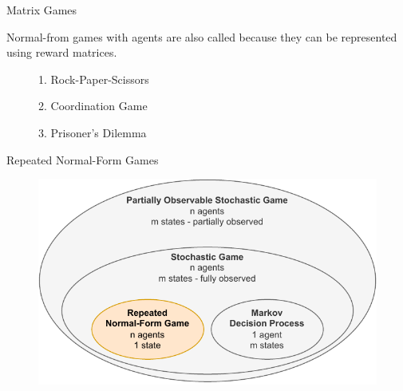 \begin{frame}{Matrix Games}

     Normal-from games with  agents are also called  because they can be represented using reward matrices.
    \vspace{5pt} 
    
    \begin{figure}[ht]
        \centering
        \begin{minipage}[b]{0.32\textwidth}
            \centering
            \gamerps
            \caption{1. Rock-Paper-Scissors}


        \end{minipage}\hfill
        \begin{minipage}[b]{0.32\textwidth}
            \centering
            \gamecoord
            \caption{2. Coordination Game}
        \end{minipage}\hfill
        \begin{minipage}[b]{0.32\textwidth}
            \centering
            \gamepd
            \caption{3. Prisoner's Dilemma}
            \label{fig:game-pd}
        \end{minipage}
        \label{fig:matrix-games}
        \vspace{5pt}
        \begin{flushleft}
        \end{flushleft}
    \end{figure}
\end{frame}

\begin{frame}{Repeated Normal-Form Games}

\begin{figure}
    \centering
    \includegraphics{images/chapter_3/normal_form_hierarchy.pdf}
\end{figure}
    
\end{frame}


